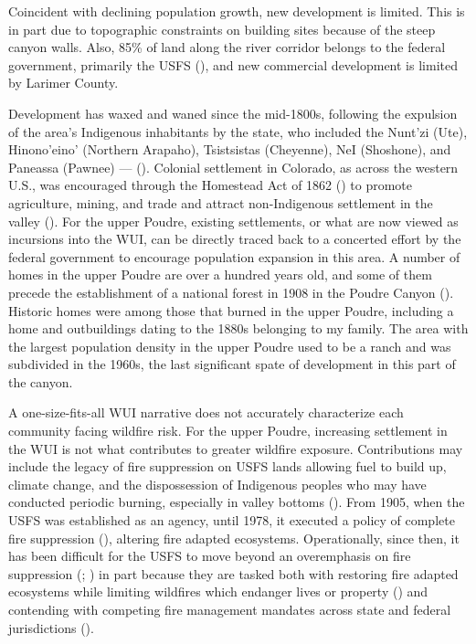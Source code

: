 \documentclass[
]{article}
\begin{document}
Coincident with declining population growth, new development is limited. This is in part due to topographic constraints on building sites because of the steep canyon walls. Also, 85\% of land along the river corridor belongs to the federal government, primarily the USFS (), and new commercial development is limited by Larimer County.

Development has waxed and waned since the mid-1800s, following the expulsion of the area's Indigenous inhabitants by the state, who included the Nunt'zi (Ute), Hinono'eino' (Northern Arapaho), Tsistsistas (Cheyenne), NeI (Shoshone), and Paneassa (Pawnee) --- (). Colonial settlement in Colorado, as across the western U.S., was encouraged through the Homestead Act of 1862 () to promote agriculture, mining, and trade and attract non-Indigenous settlement in the valley (). For the upper Poudre, existing settlements, or what are now viewed as incursions into the WUI, can be directly traced back to a concerted effort by the federal government to encourage population expansion in this area. A number of homes in the upper Poudre are over a hundred years old, and some of them precede the establishment of a national forest in 1908 in the Poudre Canyon (). Historic homes were among those that burned in the upper Poudre, including a home and outbuildings dating to the 1880s belonging to my family. The area with the largest population density in the upper Poudre used to be a ranch and was subdivided in the 1960s, the last significant spate of development in this part of the canyon.

A one-size-fits-all WUI narrative does not accurately characterize each community facing wildfire risk. For the upper Poudre, increasing settlement in the WUI is not what contributes to greater wildfire exposure. Contributions may include the legacy of fire suppression on USFS lands allowing fuel to build up, climate change, and the dispossession of Indigenous peoples who may have conducted periodic burning, especially in valley bottoms (). From 1905, when the USFS was established as an agency, until 1978, it executed a policy of complete fire suppression (), altering fire adapted ecosystems. Operationally, since then, it has been difficult for the USFS to move beyond an overemphasis on fire suppression (; ) in part because they are tasked both with restoring fire adapted ecosystems while limiting wildfires which endanger lives or property () and contending with competing fire management mandates across state and federal jurisdictions ().
\end{document}
